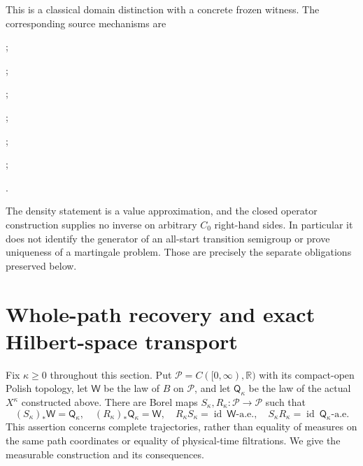 \documentclass[11pt]{article}
\newcommand{\R}{\mathbb R}
\begin{document}
This is a classical domain distinction with a concrete frozen witness.
The corresponding source mechanisms are
\par{};
\par{};
\par{};
\par{};
\par{};
\par{};
\par{}.
\par\noindent The density statement is a value approximation, and the
closed operator construction supplies no inverse on arbitrary $C_0$
right-hand sides. In particular it does not identify the generator of
an all-start transition semigroup or prove uniqueness of a martingale
problem. Those are precisely the separate obligations preserved below.


\section{Whole-path recovery and exact Hilbert-space transport}
Fix $\kappa\geq0$ throughout this section. Put
$\mathcal P=C([0,\infty),\R)$ with its compact-open Polish topology,
let $\mathsf W$ be the law of $B$ on $\mathcal P$, and let
$\mathsf Q_\kappa$ be the law of the actual $X^\kappa$ constructed
above. There are Borel maps $S_\kappa,R_\kappa:\mathcal P\to\mathcal P$
such that
\begin{equation}\label{eq:pathisomorphism}
 (S_\kappa)_*\mathsf W=\mathsf Q_\kappa,\quad
 (R_\kappa)_*\mathsf Q_\kappa=\mathsf W,\quad
 R_\kappa S_\kappa=\operatorname{id}\ \mathsf W\text{-a.e.},\quad
 S_\kappa R_\kappa=\operatorname{id}\ \mathsf Q_\kappa\text{-a.e.}
\end{equation}
This assertion concerns complete trajectories, rather than equality
of measures on the same path coordinates or equality of physical-time
filtrations. We give the measurable construction and its consequences.
\end{document}
